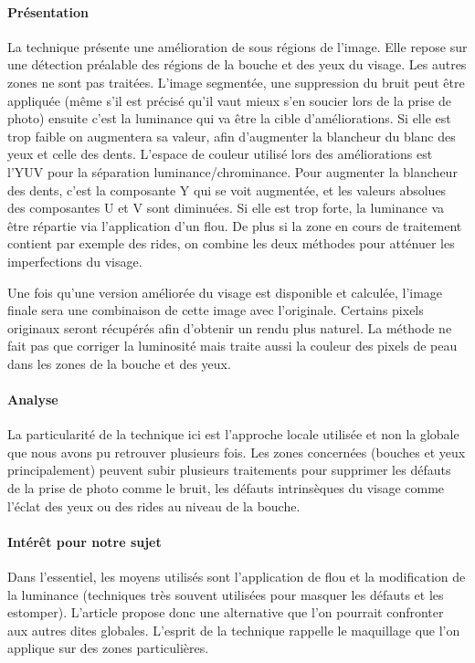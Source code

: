 \documentclass[11pt, french,screen]{report-rd-info}
\begin{document}
\paragraph{Présentation}
La technique présente une amélioration de sous régions de l’image.  Elle repose sur une détection préalable des régions de la bouche et des yeux du visage. Les autres zones ne sont pas traitées.
L’image segmentée, une suppression du bruit peut être appliquée (même s’il est précisé qu’il vaut mieux s’en soucier lors de la prise de photo) ensuite c’est la luminance qui va être la cible d’améliorations. Si elle est trop faible on augmentera sa valeur, afin d’augmenter la blancheur du blanc des yeux et celle des dents. L’espace de couleur utilisé lors des améliorations est l’YUV pour la séparation luminance/chrominance. Pour augmenter la blancheur des dents, c’est la composante Y qui se voit augmentée, et les valeurs absolues des composantes U et V sont diminuées.
Si elle est trop forte, la luminance va être répartie via l’application d’un flou. De plus si la zone en cours de traitement contient par exemple des rides, on combine les deux méthodes pour atténuer les imperfections du visage.

Une fois qu’une version améliorée du visage est disponible et calculée, l’image finale sera une combinaison de cette image avec l’originale. Certains pixels originaux seront récupérés afin d’obtenir un rendu plus naturel.
La méthode ne fait pas que corriger la luminosité mais traite aussi la couleur des pixels de peau dans les zones de la bouche et des yeux.
\paragraph{Analyse}
La particularité de la technique ici est l’approche locale utilisée et non la globale que nous avons pu retrouver plusieurs fois. Les zones concernées (bouches et yeux principalement) peuvent subir plusieurs traitements pour supprimer les défauts de la prise de photo comme le bruit, les défauts intrinsèques du visage comme l’éclat des yeux ou des rides au niveau de la bouche.
\paragraph{Intérêt pour notre sujet}
Dans l’essentiel, les moyens utilisés sont l’application de flou et la modification de la luminance (techniques très souvent utilisées pour masquer les défauts et les estomper). L’article propose donc une alternative que l’on pourrait confronter aux autres dites globales. L’esprit de la technique rappelle le maquillage que l’on applique sur des zones particulières.
\end{document}
